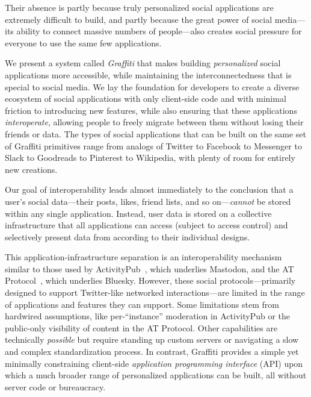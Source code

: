 Their absence is partly because truly personalized social applications
are extremely difficult to build,
and partly because the great power of social media---its
ability to connect massive numbers of people---also
creates social pressure for everyone to use the same few applications.

We present a system called \emph{Graffiti} that makes
building \emph{personalized} social applications
more accessible,
while maintaining the interconnectedness that is special to social media.
We lay the foundation for developers to create a diverse ecosystem
of social applications
with only client-side code and with minimal friction
to introducing new features,
while also ensuring that these applications \emph{interoperate},
allowing people to freely migrate between them without
losing their friends or data.
The types of social applications that can be built on the same set of Graffiti primitives range from analogs of Twitter to Facebook to Messenger to Slack to Goodreads to Pinterest to Wikipedia,
with plenty of room for entirely new creations.

Our goal of interoperability leads almost immediately
to the conclusion that a user's
social data---their posts, likes, friend lists, and so on---\emph{cannot}
be stored within any single application.
Instead, user data is stored on a collective infrastructure
that all applications can access (subject to access control)
and selectively present data from according to their individual designs.

This application-infrastructure separation
is an interoperability mechanism similar to
those used by
ActivityPub~{\cite{activitypub}},
which underlies Mastodon,
and the AT Protocol~{\cite{bluesky}}, which underlies Bluesky.
However, these social protocols---primarily designed to support
Twitter-like networked interactions---are limited in the range of applications
and features they can support.
Some limitations stem from hardwired assumptions,
like per-``instance'' moderation in ActivityPub
or the public-only visibility of content in the AT Protocol.
Other capabilities are technically \emph{possible}
but require standing up custom servers or navigating
a slow and complex standardization process.
In contrast, Graffiti provides a simple yet minimally constraining
client-side \emph{application programming interface} (API)
upon which a much broader range of personalized applications can be built, all
without server code or bureaucracy.

